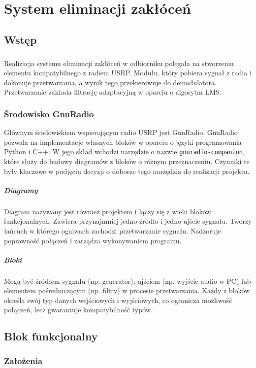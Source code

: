 \chapter{System eliminacji zakłóceń}
\section{Wstęp}
\paragraph{}
Realizacja systemu eliminacji zakłóceń w odbiorniku polegała na stworzeniu elementu kompatybilnego z radiem USRP. Modułu, który pobiera sygnał z radia i dokonuje przetwarzania, a wynik tego przekierowuje do demodulatora.
Przetwarzanie zakłada filtrację adaptacyjną w oparciu o algorytm LMS.
\subsection{Środowisko GnuRadio}
Głównym środowiskiem wspierającym radio USRP jest GnuRadio. GnuRadio pozwala na implementacje własnych bloków w oparciu o języki programowania Python i C++. W jego skład wchodzi narzędzie o nazwie \texttt{gnuradio-companion}, które służy do budowy diagramów z bloków o różnym przeznaczeniu. Czynniki te były kluczowe w podjęciu decyzji o doborze tego narzędzia do realizacji projektu.
\paragraph*{Diagramy}
    Diagram nazywany jest również projektem i łączy się z wielu bloków funkcjonalnych.
    Zawiera przynajmniej jedno źródło i jedno ujście sygnału.
    Tworzy łańcuch w którego ogniwach zachodzi przetwarzanie sygnału.
    Nadzoruje poprawność połączeń i zarządza wykonywaniem programu.
\paragraph*{Bloki}
    Mogą być źródłem sygnału (np. generator), ujściem (np. wyjście audio w PC) lub elementem pośredniczącym (np. filtry) w procesie przetwarzania. 
    Każdy z bloków określa swój typ danych wejściowych i wyjściowych, co ogranicza możliwość połączeń, lecz gwarantuje kompatybilność typów.

\section{Blok funkcjonalny}
\subsection{Założenia}
